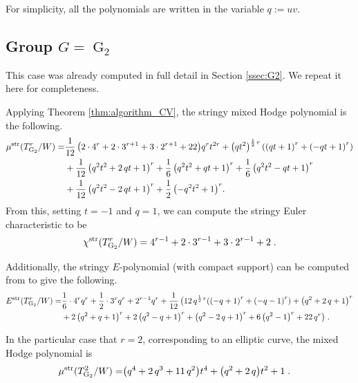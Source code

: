 \documentclass[11pt,english]{amsart}
\numberwithin{equation}{section}
\numberwithin{figure}{section}
\theoremstyle{plain}
\theoremstyle{plain}
\theoremstyle{definition}
\theoremstyle{remark}
\newcommand{\G}{\operatorname{G}}
\newcommand{\str}{\textup{str}}
\begin{document}
For simplicity, all the polynomials are written in the variable $q := uv$.

\subsection{Group $G = \G_2$} This case was already computed in full detail in Section \ref{ssec:G2}. We repeat it here for completeness. 

Applying Theorem \ref{thm:algorithm_CV}, the stringy mixed Hodge polynomial is the following.
\allowdisplaybreaks[4]
\begin{align*}
{\normalsize \mu^{\str}(T_{\G_2}^r/W)} =& \frac{1}{12} \, {\left(2 \cdot 4^{r} + 2 \cdot 3^{r + 1} + 3 \cdot 2^{r + 1} + 22\right)} q^{ r} t^{2r}+ \left(q t^{2}\right)^{\frac{1}{2} \, r} {\left({\left(q t + 1\right)}^{r} + {\left(-q t + 1\right)}^{r}\right)} \\
& + \frac{1}{12} \, {\left(q^{2} t^{2} + 2 \, q t + 1\right)}^{r} + \frac{1}{6} \, {\left(q^{2} t^{2} + q t + 1\right)}^{r} + \frac{1}{6} \, {\left(q^{2} t^{2} - q t + 1\right)}^{r} \\
& + \frac{1}{12} \, {\left(q^{2} t^{2} - 2 \, q t + 1\right)}^{r} + \frac{1}{2} \, {\left(-q^{2} t^{2} + 1\right)}^{r}.
\end{align*}
From this, setting $t = -1$ and $q = 1$, we can compute the stringy Euler characteristic to be
$$
\chi^{\str}(T_{\G_2}^r/W) = 4^{r - 1} + 2 \cdot 3^{r - 1} + 3 \cdot 2^{r - 1} + 2\; .
$$

Additionally, the stringy $E$-polynomial (with compact support) can be computed from \cite{code_repository} to give the following.
\begin{align*}
E^{\str}(T_{\G_2}^r/W) =& \frac{1}{6} \cdot 4^{r}  q^{r} + \frac{1}{2} \cdot 3^{r}  q^{r} + 2^{r - 1}  q^{r}  + \frac{1}{12} \, \big(12 \, q^{\frac{1}{2} \, r} {\left({\left(-q + 1\right)}^{r} + {\left(-q - 1\right)}^{r}\right)} + {\left(q^{2} + 2 \, q + 1\right)}^{r} \\
& + 2 \, {\left(q^{2} + q + 1\right)}^{r} + 2 \, {\left(q^{2} - q + 1\right)}^{r} + {\left(q^{2} - 2 \, q + 1\right)}^{r} + 6 \, {\left(q^{2} - 1\right)}^{r} + 22 \, q^{r}\big) \; .
\end{align*}

In the particular case that $r = 2$, corresponding to an elliptic curve, the mixed Hodge polynomial is
\begin{align*}
\mu^{\str}(T_{\G_2}^2/W) =& {\left(q^{4} + 2 \, q^{3} + 11 \, q^{2}\right)} t^{4} + {\left(q^{2} + 2 \, q\right)} t^{2} + 1\; .
\end{align*}
\end{document}
